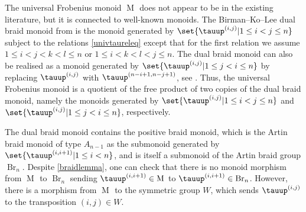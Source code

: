 \documentclass[a4paper,11pt]{amsart}
\numberwithin{equation}{subsection}
\theoremstyle{definition}
\theoremstyle{theorem}
\theoremstyle{remark}
\newcommand\Sym{W}
\newcommand{\ttau}{\tauup}
\newcommand\nBraid{\operatorname{M}^{\operatorname{}}}
\begin{document}
\begin{Remark}
 The universal Frobenius monoid $\nBraid$ does not appear to be in the
 existing literature, but it is connected to well-known monoids. The
 Birman--Ko--Lee dual braid monoid from
 \cite{BirmanKoLee,Bessismonoid} is the monoid generated
 by $\set{\ttau^{(i,j)}|1\le i<j\le n}$ subject to the relations
 \autoref{univtaureleq} except that for the first relation we assume
 $1\leq  i < j < k<l\leq n$ or $1\leq i < k< l< j\leq n$. The dual
 braid monoid can also be realised as a monoid generated by
 $\set{\ttau^{(i,j)}|1\le j<i\le n}$ by replacing $\ttau^{(i,j)}$ with
 $\ttau^{(n-i+1,n-j+1)}$,  see \cite{Fromentin}.  Thus, the universal
 Frobenius monoid is a quotient of the free product of two copies of the dual braid monoid,
 namely the monoids generated by
  $\set{\ttau^{(i,j)}|1\le i<j\le n}$ and $\set{\ttau^{(i,j)}|1\le
  j<i\le n}$, respectively.

The dual braid monoid contains the positive braid monoid, which is the Artin braid monoid of type $A_{n-1}$ as the submonoid generated by $\set{\ttau^{(i,i+1)}|1\le i<n}$, and is itself
  a submonoid of the Artin braid group $\operatorname{Br}_n$. Despite \autoref{braidlemma}, one can check that there is
  no monoid morphism from $\nBraid$ to $\operatorname{Br}_n$ sending
  $\ttau^{(i,i+1)}\in\nBraid$ to $\ttau^{(i,i+1)}\in\operatorname{Br}_n$.
  However, there is a morphism from $\nBraid$ to the symmetric group $\Sym$, which sends $\ttau^{(i,j)}$ to the transposition $(i,j)\in\Sym$.
\end{Remark}
\end{document}
